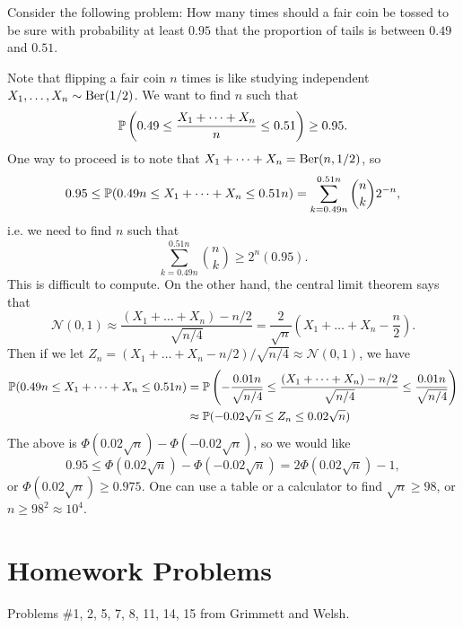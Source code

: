 \begin{example}
  Consider the following problem: How many
  times should a fair coin be tossed to be sure
  with probability at least $0.95$ that the
  proportion of
  tails is between $0.49$ and $0.51$.

  Note that flipping a fair coin $n$ times
  is like studying independent
  $X_1, \dots, X_n \sim \operatorname{Ber}(1 / 2)$. We want to
  find $n$ such that
  \[
    \mathbb{P}\left(0.49 \le \frac{X_1 + \dots + X_n}{n} \le 0.51\right) \ge 0.95.
  \]
  One way to proceed is to note that
  $X_1 + \dots + X_n = \operatorname{Ber}(n, 1 / 2)$, so
  \[
    0.95 \le \mathbb{P}(0.49n \le X_1 + \dots + X_n \le 0.51n)
    = \sum_{k = 0.49n}^{0.51n} \binom{n}{k} 2^{-n},
  \]
  i.e. we need to find $n$ such that
  \[
    \sum_{k = 0.49n}^{0.51n} \binom{n}{k} \ge 2^n(0.95).
  \]
  This is difficult to compute. On the other hand,
  the central limit theorem says that
  \[
    \mathcal{N}(0, 1)
    \approx \frac{(X_1 + \dots + X_n) - n / 2}{\sqrt{n / 4}}
    = \frac{2}{\sqrt{n}} \left(X_1 + \dots + X_n - \frac{n}{2}\right).
  \]
  Then if we let $Z_n = (X_1 + \dots + X_n - n / 2) / \sqrt{n / 4} \approx \mathcal{N}(0, 1)$, we have
  \begin{align*}
    \mathbb{P}(0.49n \le X_1 + \dots + X_n \le 0.51n)
    &= \mathbb{P}\left(-\frac{0.01n}{\sqrt{n / 4}} \le \frac{(X_1 + \dots + X_n) - n / 2}{\sqrt{n / 4}} \le \frac{0.01n}{\sqrt{n / 4}}\right) \\
    &\approx \mathbb{P}(-0.02 \sqrt{n} \le Z_n \le 0.02 \sqrt{n})
  \end{align*}
  The above is $\Phi(0.02 \sqrt{n}) - \Phi(-0.02 \sqrt{n})$, so we would like
  \[
    0.95 \le \Phi(0.02 \sqrt{n}) - \Phi(-0.02 \sqrt{n})
    = 2\Phi(0.02 \sqrt{n}) - 1,
  \]
  or $\Phi(0.02 \sqrt{n}) \ge 0.975$. One can use
  a table or a calculator to find
  $\sqrt{n} \ge 98$, or $n \ge 98^2 \approx 10^4$.
\end{example}

\section{Homework Problems}
Problems \#1, 2, 5, 7, 8, 11, 14, 15
from Grimmett and Welsh.
